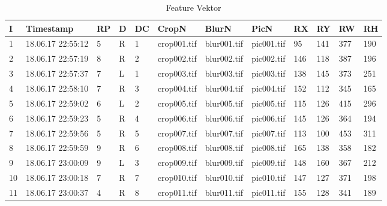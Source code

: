 \setlength\tabcolsep{5pt}

\begin{table}[H]
\centering
\begin{tabular}{|l|l|l|l|l|l|l|l|l|l|l|l|}
\hline
\textbf{I} & \textbf{Timestamp}  & \textbf{RP} & \textbf{D} & \textbf{DC} & \textbf{CropN} & \textbf{BlurN} & \textbf{PicN} & \textbf{RX} & \textbf{RY} & \textbf{RW} & \textbf{RH} \\ \hline
1            & 18.06.17 22:55:12 & 5           & R            & 1           & crop001.tif       & blur001.tif       & pic001.tif       & 95          & 141         & 377         & 190         \\ \hline
2            & 18.06.17 22:57:19 & 8           & R            & 2           & crop002.tif       & blur002.tif       & pic002.tif       & 146         & 118         & 387         & 196         \\ \hline
3            & 18.06.17 22:57:37 & 7          & L            & 1           & crop003.tif       & blur003.tif       & pic003.tif       & 138         & 145         & 373         & 251         \\ \hline
4            & 18.06.17 22:58:10 & 7           & R            & 3           & crop004.tif       & blur004.tif       & pic004.tif       & 152         & 112         & 345         & 165         \\ \hline
5            & 18.06.17 22:59:02 & 6           & L            & 2           & crop005.tif       & blur005.tif       & pic005.tif       & 115         & 126         & 415         & 296         \\ \hline
6            & 18.06.17 22:59:23 & 5           & R            & 4           & crop006.tif       & blur006.tif       & pic006.tif       & 145         & 126         & 364         & 194         \\ \hline
7            & 18.06.17 22:59:56 & 5          & R            & 5           & crop007.tif       & blur007.tif       & pic007.tif       & 113         & 100         & 453         & 311         \\ \hline
8            & 18.06.17 22:59:59 & 9           & R            & 6           & crop008.tif       & blur008.tif       & pic008.tif       & 165         & 138         & 358         & 182         \\ \hline
9            & 18.06.17 23:00:09 & 9           & L            & 3           & crop009.tif       & blur009.tif       & pic009.tif       & 148         & 160         & 367         & 212         \\ \hline
10           & 18.06.17 23:00:18 & 7           & R            & 7           & crop010.tif       & blur010.tif       & pic010.tif       & 147         & 127         & 371         & 198         \\ \hline
11           & 18.06.17 23:00:37 & 4           & R            & 8           & crop011.tif       & blur011.tif       & pic011.tif       & 155         & 128         & 341         & 189         \\ \hline
\end{tabular}
\caption{Feature Vektor}
\label{tFeatureVektor}
\end{table}

